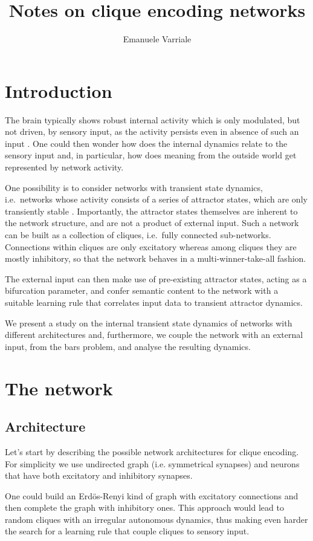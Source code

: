 \documentclass[10pt,a4paper]{article}
\author{Emanuele Varriale}
\title{Notes on clique encoding networks}
\begin{document}
	\maketitle
	\section{Introduction}
		The brain typically shows robust internal activity which is only modulated, but not driven, by sensory input, as the activity persists even in absence of such an input \cite{fiser_small_2004}. One could then wonder how does the internal dynamics relate to the sensory input and, in particular, how does meaning from the outside world get represented by network activity. 
		
		One possibility is to consider networks with transient state dynamics, i.e.\ networks whose activity consists of a series of attractor states, which are only transiently stable \cite{gros_semantic_2010}. Importantly, the attractor states themselves  are inherent to the network structure, and are not a product of external input. Such a network can be built as a collection of cliques, i.e.\ fully connected sub-networks. Connections  within cliques are only excitatory whereas among cliques they are mostly inhibitory, so that the network behaves in a multi-winner-take-all fashion. 
		
		The external input can then make use of pre-existing attractor states, acting as a bifurcation parameter, and confer semantic content to the network with a suitable learning rule that correlates input data to transient attractor dynamics. 
		
		We present a study on the internal transient state dynamics of networks with different architectures and, furthermore, we couple the network with an external input, from the bars problem, and analyse the resulting dynamics.
		
	\section{The network}
	\subsection{Architecture}
		Let's start by describing the possible network architectures for clique encoding. For simplicity we use undirected graph (i.e. symmetrical synapses) and neurons that have both excitatory and inhibitory synapses.
			
		One could build an Erd\"{o}s-Renyi kind of graph with excitatory connections and then complete the graph with inhibitory ones. This approach would lead to random cliques with an irregular autonomous dynamics, thus making even harder the search for a learning rule that couple cliques to sensory input.
			
\end{document}
